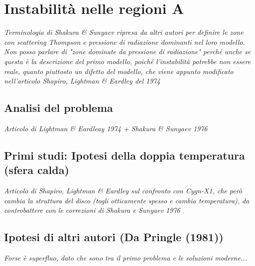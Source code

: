 \documentclass[a4paper]{article}
\begin{document}
\section{Instabilità nelle regioni A}
	\emph{Terminologia di Shakura \& Sunyaev ripresa da altri autori per definire le zone con scattering Thompson e pressione di radiazione dominanti nel loro modello.\\Non posso parlare di "zone dominate da pressione di radiazione" perché anche se questa è la descrizione del primo modello, poiché l'instabilità potrebbe non essere reale, quanto piuttosto un difetto del modello, che viene appunto modificato nell'articolo Shapiro, Lightman \& Eardley del 1974}\\
	
	\subsection{Analisi del problema}

		\emph{Articolo di Lightman \& Eardleay 1974 + Shakura \& Sunyaev 1976}

	\subsection{Primi studi: Ipotesi della doppia temperatura (sfera calda)}

		\emph{Articolo di Shapiro, Lightman \& Eardley sul confronto con Cygn-X1, che però cambia la struttura del disco (togli otticamente spesso e cambia temperatura), da controbattere con le correzioni di Shakura e Sunyaev 1976}\\
	
	\subsection{Ipotesi di altri autori (Da Pringle (1981))}
	
		\emph{Forse è superfluo, dato che sono tra il primo problema e le soluzioni moderne...}
		
\newpage
	
\end{document}
